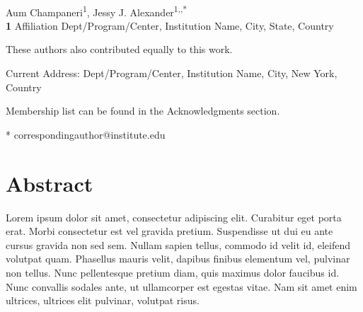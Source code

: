 \documentclass[10pt,letterpaper]{article}
\begin{document}
\vspace*{0.2in}

\begin{flushleft}
{\Large
\textbf{} %
}
\newline
\\
Aum Champaneri\textsuperscript{1\ddag},
Jessy J. Alexander\textsuperscript{1,\ddag,*}
\\
\bigskip
\textbf{1} Affiliation Dept/Program/Center, Institution Name, City, State, Country
\\
\bigskip

%
%
\ddag These authors also contributed equally to this work.

\textcurrency Current Address: Dept/Program/Center, Institution Name, City, New York, Country %

\textpilcrow Membership list can be found in the Acknowledgments section.

* correspondingauthor@institute.edu

\end{flushleft}
\section*{Abstract}
Lorem ipsum dolor sit amet, consectetur adipiscing elit. Curabitur eget porta erat. Morbi consectetur est vel gravida pretium. Suspendisse ut dui eu ante cursus gravida non sed sem. Nullam sapien tellus, commodo id velit id, eleifend volutpat quam. Phasellus mauris velit, dapibus finibus elementum vel, pulvinar non tellus. Nunc pellentesque pretium diam, quis maximus dolor faucibus id. Nunc convallis sodales ante, ut ullamcorper est egestas vitae. Nam sit amet enim ultrices, ultrices elit pulvinar, volutpat risus.
\end{document}
